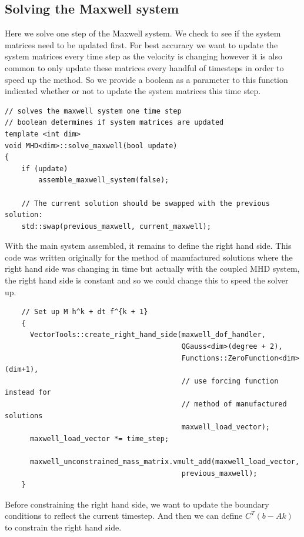 \documentclass{article}
\begin{document}
\subsection*{Solving the Maxwell system}
Here we solve one step of the Maxwell system. We check to see if the system matrices need to be updated first. For best accuracy we want to update the system matrices every time step as the velocity is changing however it is also common to only update these matrices every handful of timesteps in order to speed up the method. So we provide a boolean as a parameter to this function indicated whether or not to update the system matrices this time step. 
\begin{lstlisting}
// solves the maxwell system one time step
// boolean determines if system matrices are updated
template <int dim>
void MHD<dim>::solve_maxwell(bool update)
{
    if (update)
        assemble_maxwell_system(false);

    // The current solution should be swapped with the previous solution:
    std::swap(previous_maxwell, current_maxwell);
\end{lstlisting}
With the main system assembled, it remains to define the right hand side. This code was written originally for the method of manufactured solutions where the right hand side was changing in time but actually with the coupled MHD system, the right hand side is constant and so we could change this to speed the solver up.
\begin{lstlisting}
    // Set up M h^k + dt f^{k + 1}
    {
      VectorTools::create_right_hand_side(maxwell_dof_handler,
                                          QGauss<dim>(degree + 2),
                                          Functions::ZeroFunction<dim>(dim+1),
                                          // use forcing function instead for 
                                          // method of manufactured solutions
                                          maxwell_load_vector);
      maxwell_load_vector *= time_step;

      maxwell_unconstrained_mass_matrix.vmult_add(maxwell_load_vector,
                                          previous_maxwell);
    }
\end{lstlisting}
Before constraining the right hand side, we want to update the boundary conditions to reflect the current timestep. And then we can define $C^T(b - Ak)$ to constrain the right hand side. 
\end{document}
